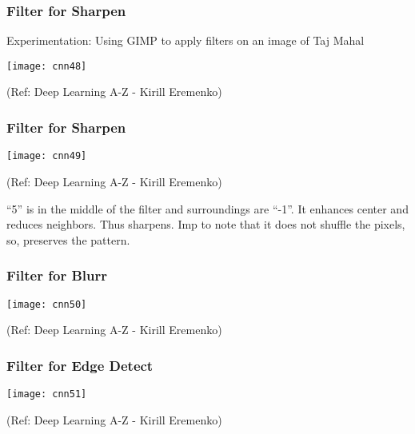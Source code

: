 \begin{frame}[fragile] \frametitle{Filter for Sharpen}
Experimentation: Using GIMP to apply filters on an image of Taj Mahal

\begin{center}
\texttt{[image: cnn48]}

\tiny{(Ref: Deep Learning A-Z - Kirill Eremenko)}
\end{center}

\end{frame}

\begin{frame}[fragile] \frametitle{Filter for Sharpen}

\begin{center}
\texttt{[image: cnn49]}

\tiny{(Ref: Deep Learning A-Z - Kirill Eremenko)}
\end{center}

``5'' is in the middle of the filter and surroundings are ``-1''.  It enhances center and reduces neighbors. Thus sharpens.
Imp to note that it does not shuffle the pixels, so, preserves the pattern.
\end{frame}

\begin{frame}[fragile] \frametitle{Filter for Blurr}

\begin{center}
\texttt{[image: cnn50]}

\tiny{(Ref: Deep Learning A-Z - Kirill Eremenko)}
\end{center}

\end{frame}

\begin{frame}[fragile] \frametitle{Filter for Edge Detect}

\begin{center}
\texttt{[image: cnn51]}

\tiny{(Ref: Deep Learning A-Z - Kirill Eremenko)}
\end{center}

\end{frame}

